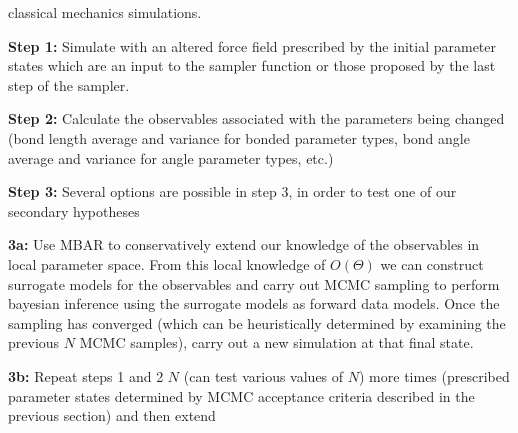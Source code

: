 \documentclass{report}
\begin{document}
\begin{outline}
\begin{outline}
\begin{outline}
\begin{outline}
{                                   classical mechanics simulations.}
        \begin{outline}
          \item{\textbf{Step 1:} Simulate with an altered force field prescribed by the initial parameter states which are an input to the sampler function or
                those proposed by the last step of the sampler.}
          \item{\textbf{Step 2:} Calculate the observables associated with the parameters being changed (bond length average and variance for bonded parameter
                types, bond angle average and variance for angle parameter types, etc.)}
          \item{\textbf{Step 3:} Several options are possible in step 3, in order to test one of our secondary hypotheses}
          \begin{outline}
            \item{\textbf{3a:} Use MBAR to conservatively extend our knowledge of the observables in local parameter space. From this local knowledge of $O\left(\Theta\right)$ we can construct
                  surrogate models for the observables and carry out MCMC sampling to perform bayesian inference using the surrogate models as forward data models. Once the sampling has converged (which can be
                  heuristically determined by examining the previous $N$ MCMC samples), carry out a new simulation at that final state.}
            \item{\textbf{3b:} Repeat steps 1 and 2 $N$ (can test various values of $N$) more times (prescribed parameter states determined by MCMC acceptance criteria described in the previous section) and then extend 
}
\end{outline}
\end{outline}
\end{outline}
\end{outline}
\end{outline}
\end{outline}
\end{document}
